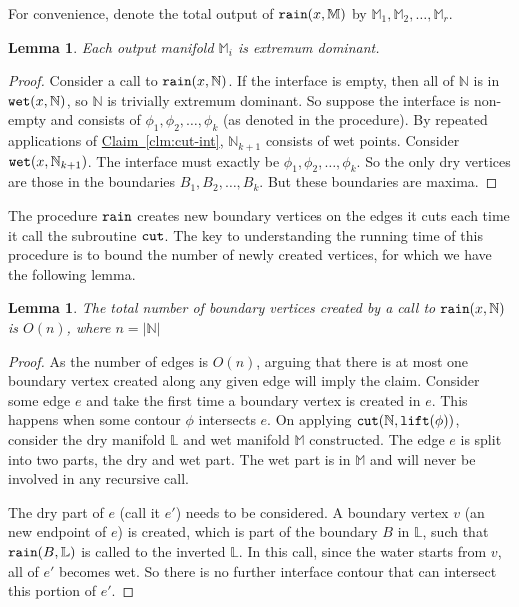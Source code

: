 \documentclass[11pt]{article}
\newtheorem{lemma}[theorem]{Lemma}
\theoremstyle{definition}
\newcommand{\LL}{\mathbb{L}}
\newcommand{\MM}{\mathbb{M}}
\newcommand{\NN}{\mathbb{N}}
\newcommand{\Clm}[1]{\hyperref[clm:#1]{Claim~\ref*{clm:#1}}} %
\newcommand{\cut}{{\tt cut}}
\newcommand{\lift}{{\tt lift}}
\newcommand{\rain}{{\tt rain}}
\newcommand{\wet}{{\tt wet}}
\begin{document}
\medskip
For convenience, denote the total output of $\rain(x,\MM)$ by $\MM_1, \MM_2, \ldots, \MM_r$.

\begin{lemma} \label{lem:rain-1} Each output manifold $\MM_i$ is extremum dominant.
\end{lemma}

\begin{proof} Consider a call to $\rain(x,\NN)$. If the interface is empty, then all of $\NN$
is in $\wet(x,\NN)$, so $\NN$ is trivially extremum dominant. So suppose the interface
is non-empty and consists of $\phi_1, \phi_2, \ldots, \phi_k$ (as denoted in the procedure).
By repeated applications of \Clm{cut-int}, $\NN_{k+1}$ consists of wet points. 
Consider $\wet(x,\NN_{k+1})$. The interface must exactly be $\phi_1, \phi_2, \ldots, \phi_k$.
So the only dry vertices are those in the boundaries $B_1, B_2, \ldots, B_k$. But these
boundaries are maxima.
\end{proof}

The procedure $\rain$ creates new boundary vertices on the edges it cuts each time it call the 
subroutine $\cut$.  The key to understanding the running time of this procedure is to bound the 
number of newly created vertices, for which we have the following lemma.

\begin{lemma}\label{lem:new-verts}
The total number of boundary vertices created by a call to $\rain(x, \NN)$ is $O(n)$, where $n=|\NN|$
\end{lemma}
\begin{proof}
As the number of edges is $O(n)$, arguing that there is at most one boundary vertex created along any given edge will imply the claim.
Consider some edge $e$ and take the first time a boundary vertex is created in $e$.
This happens when some contour $\phi$ intersects $e$. On applying $\cut(\NN,\lift(\phi))$,
consider the dry manifold $\LL$ and wet manifold $\MM$ constructed. The edge $e$ is split into two parts, the dry and wet part.
The wet part is in $\MM$ and will never be involved in any recursive call.

The dry part of $e$ (call it $e'$) needs to be considered.
A boundary vertex $v$ (an new endpoint of $e$) is created, which is part of the boundary $B$ in $\LL$,
such that $\rain(B,\LL)$ is called to the inverted $\LL$. In this call, since the water starts from $v$,
all of $e'$ becomes wet. So there is no further interface contour that can intersect this portion of $e'$.
\end{proof}
\end{document}
